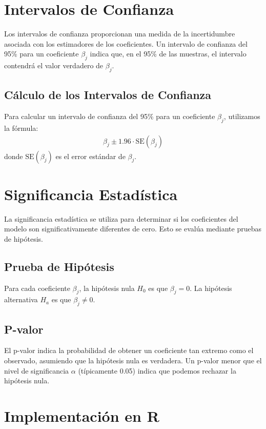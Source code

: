 \documentclass[a4paper]{report} %
\begin{document}
\section{Intervalos de Confianza}

Los intervalos de confianza proporcionan una medida de la incertidumbre asociada con los estimadores de los coeficientes. Un intervalo de confianza del 95\% para un coeficiente $\beta_j$ indica que, en el 95\% de las muestras, el intervalo contendr\'a el valor verdadero de $\beta_j$.

\subsection{C\'alculo de los Intervalos de Confianza}

Para calcular un intervalo de confianza del 95\% para un coeficiente $\beta_j$, utilizamos la f\'ormula:
\begin{eqnarray*}
\beta_j \pm 1.96 \cdot \text{SE}(\beta_j)
\end{eqnarray*}
donde $\text{SE}(\beta_j)$ es el error est\'andar de $\beta_j$.

\section{Significancia Estad\'istica}

La significancia estad\'istica se utiliza para determinar si los coeficientes del modelo son significativamente diferentes de cero. Esto se eval\'ua mediante pruebas de hip\'otesis.

\subsection{Prueba de Hip\'otesis}

Para cada coeficiente $\beta_j$, la hip\'otesis nula $H_0$ es que $\beta_j = 0$. La hip\'otesis alternativa $H_a$ es que $\beta_j \neq 0$.

\subsection{P-valor}

El p-valor indica la probabilidad de obtener un coeficiente tan extremo como el observado, asumiendo que la hip\'otesis nula es verdadera. Un p-valor menor que el nivel de significancia $\alpha$ (t\'ipicamente 0.05) indica que podemos rechazar la hip\'otesis nula.

\section{Implementaci\'on en R}
\end{document}
